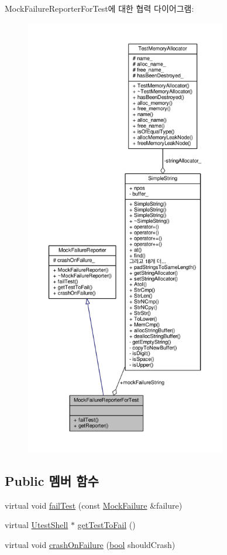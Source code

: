 Mock\+Failure\+Reporter\+For\+Test에 대한 협력 다이어그램\+:
\nopagebreak
\begin{figure}[H]
\begin{center}
\leavevmode
\includegraphics[height=550pt]{class_mock_failure_reporter_for_test__coll__graph}
\end{center}
\end{figure}
\subsection*{Public 멤버 함수}
\begin{DoxyCompactItemize}
\item 
virtual void \hyperlink{class_mock_failure_reporter_for_test_a275e824525aa26cb8874437442cdc186}{fail\+Test} (const \hyperlink{class_mock_failure}{Mock\+Failure} \&failure)
\item 
virtual \hyperlink{class_utest_shell}{Utest\+Shell} $\ast$ \hyperlink{class_mock_failure_reporter_ae3f75fac53b4d3395e02ee8eca858422}{get\+Test\+To\+Fail} ()
\item 
virtual void \hyperlink{class_mock_failure_reporter_aaeded55857f443ab119b74f1fda402aa}{crash\+On\+Failure} (\hyperlink{avb__gptp_8h_af6a258d8f3ee5206d682d799316314b1}{bool} should\+Crash)
\end{DoxyCompactItemize}
